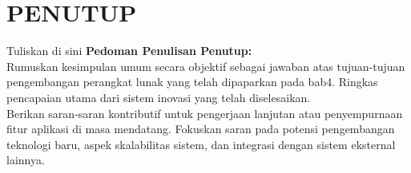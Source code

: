 \chapter{PENUTUP}


Tuliskan di sini \textbf{Pedoman Penulisan Penutup:} \\
Rumuskan kesimpulan umum secara objektif sebagai jawaban atas tujuan-tujuan pengembangan perangkat lunak yang telah dipaparkan pada bab4. Ringkas pencapaian utama dari sistem inovasi yang telah diselesaikan.\\
Berikan saran-saran kontributif untuk pengerjaan lanjutan atau penyempurnaan fitur aplikasi di masa mendatang. Fokuskan saran pada potensi pengembangan teknologi baru, aspek skalabilitas sistem, dan integrasi dengan sistem eksternal lainnya.

